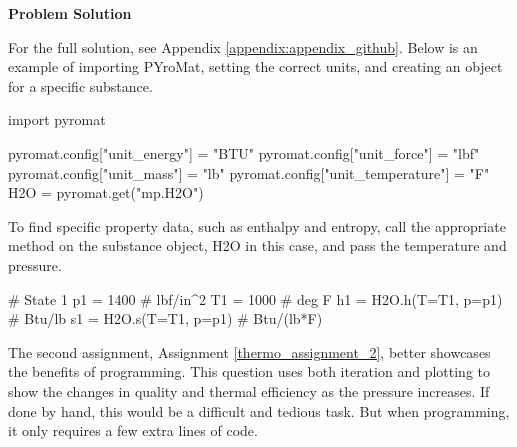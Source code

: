 \begin{tcolorbox}[breakable, enhanced jigsaw, title=ME 513: Assignment \ref{thermo_assignment_1}, 
    colframe=ksu-purple, colback=ksu-gray]
    \tcblower
    \textbf{Problem Solution}

    For the full solution, see Appendix \ref{appendix:appendix_github}. Below is an example of 
    importing PYroMat, setting the correct units, and creating an object for a specific
    substance.

\begin{python}
import pyromat

pyromat.config["unit_energy"] = "BTU"
pyromat.config["unit_force"] = "lbf"
pyromat.config["unit_mass"] = "lb"
pyromat.config["unit_temperature"] = "F"
H2O = pyromat.get("mp.H2O")
\end{python}

To find specific property data, such as enthalpy and entropy, call the appropriate method
on the substance object, H2O in this case, and pass the temperature and pressure.

\begin{python}
# State 1
p1 = 1400 # lbf/in^2
T1 = 1000 # deg F
h1 = H2O.h(T=T1, p=p1) # Btu/lb
s1 = H2O.s(T=T1, p=p1) # Btu/(lb*F)
\end{python}
\end{tcolorbox}

The second assignment, Assignment \ref{thermo_assignment_2}, better showcases the benefits of 
programming. This question uses both iteration and plotting to show the changes in quality 
and thermal efficiency as the pressure increases. If done by hand, this would be a difficult 
and tedious task. But when programming, it only requires a few extra lines of code.

\label{thermo_assignment_2}

